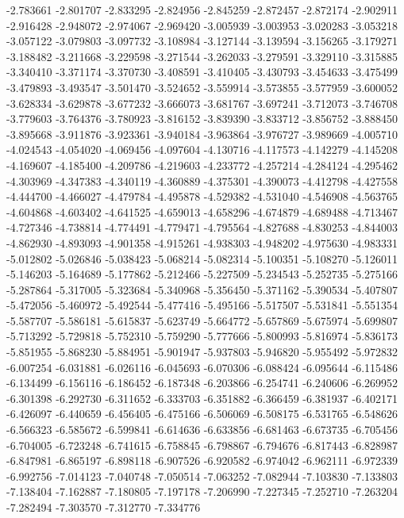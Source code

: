 -2.783661
-2.801707
-2.833295
-2.824956
-2.845259
-2.872457
-2.872174
-2.902911
-2.916428
-2.948072
-2.974067
-2.969420
-3.005939
-3.003953
-3.020283
-3.053218
-3.057122
-3.079803
-3.097732
-3.108984
-3.127144
-3.139594
-3.156265
-3.179271
-3.188482
-3.211668
-3.229598
-3.271544
-3.262033
-3.279591
-3.329110
-3.315885
-3.340410
-3.371174
-3.370730
-3.408591
-3.410405
-3.430793
-3.454633
-3.475499
-3.479893
-3.493547
-3.501470
-3.524652
-3.559914
-3.573855
-3.577959
-3.600052
-3.628334
-3.629878
-3.677232
-3.666073
-3.681767
-3.697241
-3.712073
-3.746708
-3.779603
-3.764376
-3.780923
-3.816152
-3.839390
-3.833712
-3.856752
-3.888450
-3.895668
-3.911876
-3.923361
-3.940184
-3.963864
-3.976727
-3.989669
-4.005710
-4.024543
-4.054020
-4.069456
-4.097604
-4.130716
-4.117573
-4.142279
-4.145208
-4.169607
-4.185400
-4.209786
-4.219603
-4.233772
-4.257214
-4.284124
-4.295462
-4.303969
-4.347383
-4.340119
-4.360889
-4.375301
-4.390073
-4.412798
-4.427558
-4.444700
-4.466027
-4.479784
-4.495878
-4.529382
-4.531040
-4.546908
-4.563765
-4.604868
-4.603402
-4.641525
-4.659013
-4.658296
-4.674879
-4.689488
-4.713467
-4.727346
-4.738814
-4.774491
-4.779471
-4.795564
-4.827688
-4.830253
-4.844003
-4.862930
-4.893093
-4.901358
-4.915261
-4.938303
-4.948202
-4.975630
-4.983331
-5.012802
-5.026846
-5.038423
-5.068214
-5.082314
-5.100351
-5.108270
-5.126011
-5.146203
-5.164689
-5.177862
-5.212466
-5.227509
-5.234543
-5.252735
-5.275166
-5.287864
-5.317005
-5.323684
-5.340968
-5.356450
-5.371162
-5.390534
-5.407807
-5.472056
-5.460972
-5.492544
-5.477416
-5.495166
-5.517507
-5.531841
-5.551354
-5.587707
-5.586181
-5.615837
-5.623749
-5.664772
-5.657869
-5.675974
-5.699807
-5.713292
-5.729818
-5.752310
-5.759290
-5.777666
-5.800993
-5.816974
-5.836173
-5.851955
-5.868230
-5.884951
-5.901947
-5.937803
-5.946820
-5.955492
-5.972832
-6.007254
-6.031881
-6.026116
-6.045693
-6.070306
-6.088424
-6.095644
-6.115486
-6.134499
-6.156116
-6.186452
-6.187348
-6.203866
-6.254741
-6.240606
-6.269952
-6.301398
-6.292730
-6.311652
-6.333703
-6.351882
-6.366459
-6.381937
-6.402171
-6.426097
-6.440659
-6.456405
-6.475166
-6.506069
-6.508175
-6.531765
-6.548626
-6.566323
-6.585672
-6.599841
-6.614636
-6.633856
-6.681463
-6.673735
-6.705456
-6.704005
-6.723248
-6.741615
-6.758845
-6.798867
-6.794676
-6.817443
-6.828987
-6.847981
-6.865197
-6.898118
-6.907526
-6.920582
-6.974042
-6.962111
-6.972339
-6.992756
-7.014123
-7.040748
-7.050514
-7.063252
-7.082944
-7.103830
-7.133803
-7.138404
-7.162887
-7.180805
-7.197178
-7.206990
-7.227345
-7.252710
-7.263204
-7.282494
-7.303570
-7.312770
-7.334776
